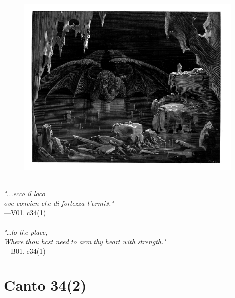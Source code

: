\documentclass[../Dore_vision.tex]{subfiles}
\begin{document}
\begin{figure}[ht]
\centering
\includegraphics[height=\figsize]{illustrations/book_1/V01, c34(1).jpg}
\end{figure}

\begin{center}
\begin{minipage}{0.8\linewidth}
\textit{\\
"...ecco il loco\\ove convien che di fortezza t’armi»."} \\
—V01, c34(1) \\~\\
\textit{"…lo the place,\\Where thou hast need to arm thy heart with strength.\textquotesingle"} \\
—B01, c34(1)
\end{minipage}
\end{center}

\newpage

\section{Canto 34(2)}
\end{document}
